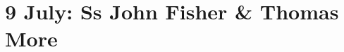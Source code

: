 {
\section{9 July: Ss John Fisher \& Thomas More}
\subtitle{ Class}
\subtitle{I \& II Vespers}
\medskip

\def\deusinadjutoriumsolemn{F}
\def\vrlinebreak{F}
\def\preanttwo{\vspace{-0.5\baselineskip}}
\def\begincollectcols{\begin{parcolumns}[rulebetween,colwidths={1=0.44\linewidth}]{2}}
\def\definevesperspropers{%
  
  \ifthenelse{\boolean{birmingham}}{
  	\def\prepsalmtitletwo{\bigskip\bigskip\bigskip}
  	\def\postpsalmtitletwo{\bigskip}
  	\def\postpsalmtitlethree{\needspace{10\baselineskip}}
  	\def\postpsalmtitlefive{\bigskip}
  }{
  }
}
\def\definevesperspropersalt{
	
	\def\vrlinebreak{T}
	\ifthenelse{\boolean{birmingham}}{
		\def\prepsalmtitletwo{\bigskip\bigskip}
		\def\postpsalmtitletwo{\bigskip}
		\def\postpsalmtitlethree{\needspace{10\baselineskip}}
	}{
	}
}
\def\vesperspropersnote{At II Vespers:}
\def\vesperspropersaltnote{At I Vespers:}
\def\prevesperspsalms{\noindent\printnote{Chapter and following, page \pageref{july9-chapter}.\\}
  \medskip
  \hrule
  \medskip
}
\def\vesperspsalmslabel{\label{july9-2vespers}}
\def\prevesperspsalmsalt{\noindent\printnote{II Vespers psalms and antiphons, page \pageref{july9-2vespers}.}\medskip}
\def\prechapter{\label{july9-chapter}}

\bigskip
\benedicamusdomino{}
}